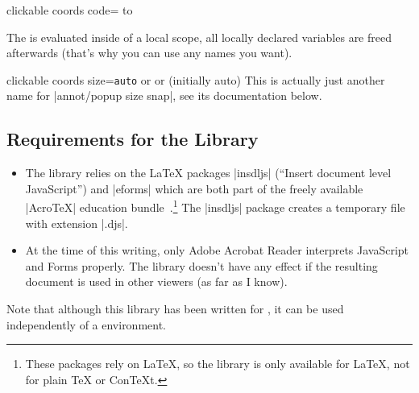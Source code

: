 \begin{pgfplotskey}{clickable coords code=%
}
        \noindent\hbox to %

    The  is evaluated inside of a local scope, all locally
    declared variables are freed afterwards (that's why you can use any names
    you want).
\end{pgfplotskey}

\begin{pgfplotskey}{%
    clickable coords size=\texttt{auto} or  or
     (initially auto)%
}
    This is actually just another name for |annot/popup size snap|, see its
    documentation below.
\end{pgfplotskey}


\subsection{Requirements for the Library}

\begin{itemize}
    \item The library relies on the \LaTeX{} packages |insdljs| (``Insert
        document level JavaScript'') and |eforms| which are both part of the
        freely available |AcroTeX| education
        bundle~\cite{acrotex}.\footnote{These packages rely on \LaTeX{}, so
        the library is only available for \LaTeX{}, not for plain \TeX{} or
        Con\TeX{}t.} The |insdljs| package creates a temporary file with
        extension |.djs|.
    \item At the time of this writing, only Adobe Acrobat Reader interprets
        JavaScript and Forms properly. The library doesn't have any effect if
        the resulting document is used in other viewers (as far as I know).
\end{itemize}
%
Note that although this library has been written for \PGFPlots{}, it can be
used independently of a \PGFPlots{} environment.


